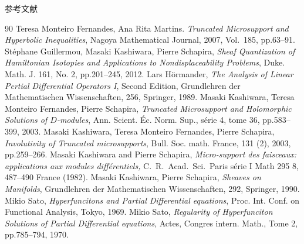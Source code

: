\documentclass[dvipdfmx,10pt,aspectratio=169,leqno]{beamer}%
\numberwithin{equation}{subsection}
\theoremstyle{mystyle}
\begin{document}
\begin{frame}[allowframebreaks]{参考文献}
  \begin{thebibliography}{90}\beamertemplatetextbibitems
   Teresa Monteiro Fernandes, Ana Rita Martins. 
  \textit{Truncated Microsupport and Hyperbolic Inequalities}, 
  Nagoya Mathematical Journal, 2007, Vol.\ 185, pp.63--91. 
   St\'ephane Guillermou, 
  Masaki Kashiwara, Pierre Schapira, 
  \textit{Sheaf Quantization of Hamiltonian Isotopies and Applications to Nondisplaceability Problems}, 
  Duke. Math. J. 161, No. 2, pp.201--245, 2012.  
   Lars H\"ormander, 
  \textit{The Analysis of Linear Pertial Differential Operators I}, Second Edition,
  Grundlehren der Mathematischen Wissenschaften, 256, Springer, 1989.
   Masaki Kashiwara, Teresa Monteiro Fernandes, Pierre Schapira, 
  \textit{Truncated Microsupport and Holomorphic Solutions 
  of \(D\)-modules}, 
  Ann. Scient. \'Ec. Norm. Sup., s\'erie 4, tome 36, 
  pp.583--399, 2003.
   Masaki Kashiwara, Teresa Monteiro Fernandes, Pierre Schapira, 
  \textit{Involutivity of Truncated microsupports}, 
  Bull. Soc. math. France, 131 (2), 2003, 
  pp.259--266.
   Masaki Kashiwara and Pierre Schapira,
  \textit{Micro-support des faisceaux: applications 
  aux modules diff{\'e}rentiels,}
  C.~R.~Acad.\ Sci.\ Paris s{\'e}rie I Math 295 8, 487--490 France (1982).
   Masaki Kashiwara, Pierre Schapira, 
  \textit{Sheaves on Manifolds}, 
  Grundlehren der Mathematischen Wissenschaften, 292, Springer, 1990.
   Mikio Sato, 
  \textit{Hyperfuncitons and 
  Partial Differential equations}, 
  Proc. Int. Conf. on Functional Analysis, Tokyo, 1969.
   Mikio Sato, 
  \textit{Regularity of Hyperfunciton Solutions of 
  Partial Differential equations}, 
  Actes, Congres intern. Math., 
  Tome 2, pp.785--794, 1970.
\end{thebibliography}
\end{frame}
\end{document}
